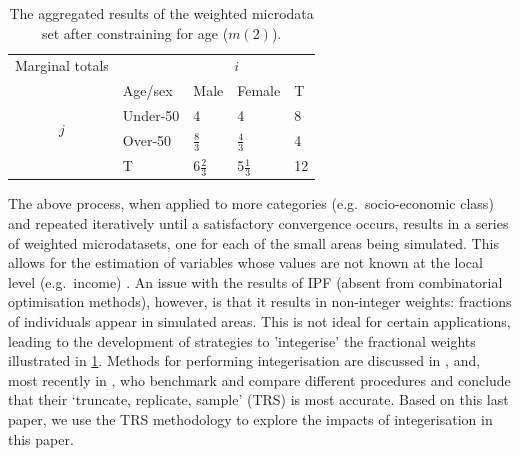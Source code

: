 \documentclass[a4paper,10pt]{article}
\begin{document}
\begin{table}[htbp]
\centering
\caption[Aggregated results after constraining for age]{The
aggregated results of the weighted
microdata set after constraining for age ($m(2)$).
}

\begin{tabular}{cllll}\toprule
Marginal totals&  & \multicolumn{2}{c}{$i$} & \\
& Age/sex & Male & Female & T\\ \midrule
\multirow{2}{*}{$j$} & Under-50 & 4 & 4 & 8\\
& Over-50 & $\frac{8}{3}$ & $\frac{4}{3}$ & 4 \\
& T & $6\frac{2}{3}$ & 5$\frac{1}{3}$ & 12\\
\bottomrule
\end{tabular}
\label{t:m2}
\end{table}

The above process, when applied to more categories (e.g.~socio-economic class)
and repeated iteratively until a satisfactory convergence occurs, results in a
series of weighted microdatasets, one for each of the small areas being
simulated. This allows for the estimation of variables whose values are not
known at the local level (e.g.~income) \citep{Ballas2005c}. An issue
with the results of IPF (absent from combinatorial optimisation methods),
however, is that it results in non-integer weights: fractions of individuals
appear in simulated areas. This is not ideal
for certain applications, leading to the development of strategies
to 'integerise' the fractional weights illustrated in \cref{t:m2}.
Methods for performing integerisation are discussed in
\citep{Ballas2005c}, \citep{Pritchard2012} and, most recently
in \citep{Lovelace2013-trs}, who benchmark and compare different procedures
and conclude that their `truncate, replicate, sample' (TRS) is most accurate.
Based on this last paper, we use the TRS methodology to explore the impacts
of integerisation in this paper.

\end{document}
